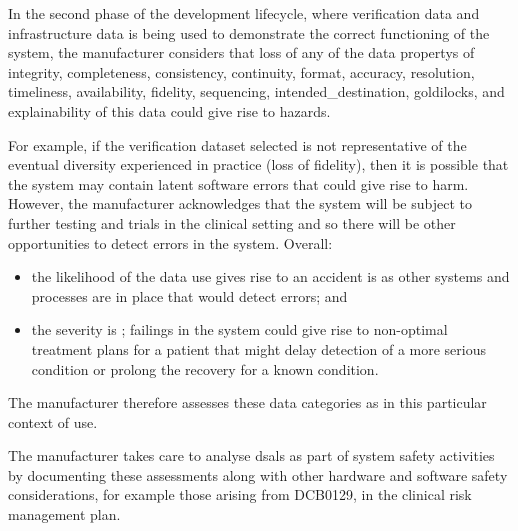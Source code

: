 In the second phase of the development lifecycle, where \gls{verification} data and infrastructure data is being used to demonstrate the correct functioning of the system, the manufacturer considers that loss of any of the \glspl{data property} of \gls{integrity}, \gls{completeness}, \gls{consistency}, \gls{continuity}, \gls{format}, \gls{accuracy}, \gls{resolution}, \gls{timeliness}, \gls{availability}, \gls{fidelity}, \gls{sequencing}, \gls{intended_destination}, \gls{goldilocks}, and explainability of this data could give rise to \glspl{hazard}.

For example, if the \gls{verification} \gls{dataset} selected is not representative of the eventual diversity experienced in practice (loss of \gls{fidelity}), then it is possible that the system may contain latent software errors that could give rise to harm. However, the manufacturer acknowledges that the system will be subject to further testing and trials in the clinical setting and so there will be other opportunities to detect errors in the system. Overall:
\begin{itemize}
  \item the likelihood of the data use gives rise to an accident is  as other systems and processes are in place that would detect errors; and
  \item the severity is ; failings in the system could give rise to non-optimal treatment plans for a patient that might delay detection of a more serious condition or prolong the recovery for a known condition.
\end{itemize}

The manufacturer therefore assesses these data categories as  in this particular context of use.

The manufacturer takes care to analyse \glspl{dsal} as part of system safety activities by documenting these assessments along with other hardware and software safety considerations, for example those arising from DCB0129, in the clinical risk management plan.

